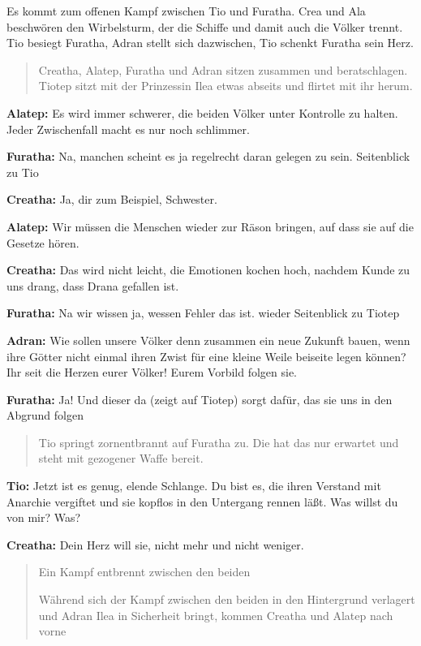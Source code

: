 \documentclass[a5paper,6pt]{book}
\begin{document}
Es kommt zum offenen Kampf zwischen Tio und Furatha. Crea und Ala beschwören den
Wirbelsturm, der die Schiffe und damit auch die Völker trennt. Tio besiegt Furatha, Adran
stellt sich dazwischen, Tio schenkt Furatha sein Herz.

\begin{quote}
Creatha, Alatep, Furatha und Adran sitzen zusammen und beratschlagen. Tiotep sitzt mit der
Prinzessin Ilea etwas abseits und flirtet mit ihr herum.
\end{quote}


\textbf{Alatep:} Es wird immer schwerer, die beiden Völker unter Kontrolle zu halten. Jeder
Zwischenfall macht es nur noch schlimmer.

\textbf{Furatha:} Na, manchen scheint es ja regelrecht daran gelegen zu sein.
Seitenblick zu Tio

\textbf{Creatha:} Ja, dir zum Beispiel, Schwester.

\textbf{Alatep:} Wir müssen die Menschen wieder zur Räson bringen, auf dass sie auf die Gesetze
hören.

\textbf{Creatha:} Das wird nicht leicht, die Emotionen kochen hoch, nachdem Kunde zu uns drang,
dass Drana gefallen ist.

\textbf{Furatha:} Na wir wissen ja, wessen Fehler das ist. wieder Seitenblick zu Tiotep

\textbf{Adran:} Wie sollen unsere Völker denn zusammen ein neue Zukunft bauen, wenn ihre Götter
nicht einmal ihren Zwist für eine kleine Weile beiseite legen können? Ihr seit die
Herzen eurer Völker! Eurem Vorbild folgen sie.

\textbf{Furatha:} Ja! Und dieser da (zeigt auf Tiotep) sorgt dafür, das sie uns in den Abgrund folgen

\begin{quote}
Tio springt zornentbrannt auf Furatha zu. Die hat das nur erwartet und steht mit gezogener
Waffe bereit.
\end{quote}


\textbf{Tio:} Jetzt ist es genug, elende Schlange. Du bist es, die ihren Verstand mit Anarchie vergiftet
und sie kopflos in den Untergang rennen läßt. Was willst du von mir? Was?

\textbf{Creatha:} Dein Herz will sie, nicht mehr und nicht weniger.


\begin{quote}
Ein Kampf entbrennt zwischen den beiden

Während sich der Kampf zwischen den beiden in den Hintergrund verlagert und Adran Ilea in
Sicherheit bringt, kommen Creatha und Alatep nach vorne
\end{quote}
\end{document}
